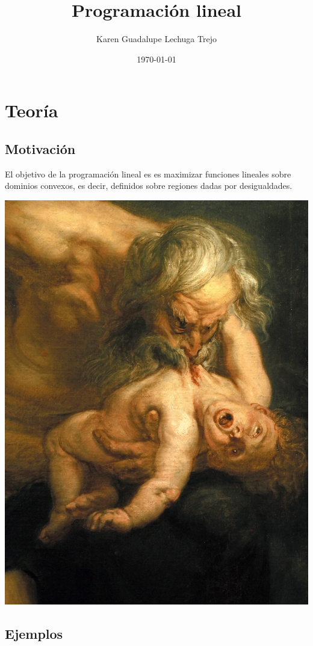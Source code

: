 \documentclass[11pt]{article}
\author{Karen Guadalupe Lechuga Trejo}
\date{\today}
\title{Programación lineal}
\begin{document}
\maketitle
\tableofcontents


\section{Teoría}
\label{sec:org589280a}
\subsection{Motivación}
\label{sec:org68ab1d9}

El objetivo de la programación lineal es es maximizar funciones
lineales sobre dominios convexos, es decir, definidos sobre regiones
dadas por desigualdades.

\begin{center}
\includegraphics[width=.9\linewidth]{Rubens-Saturno-detalle.jpg}
\end{center}

\subsection{Ejemplos}
\label{sec:org0ba3090}
\end{document}
